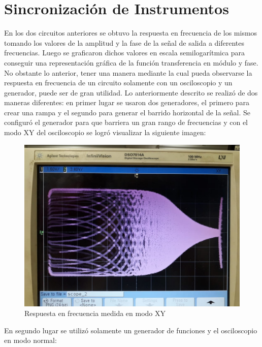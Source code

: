\section{Sincronización de Instrumentos}

En los dos circuitos anteriores se obtuvo la respuesta en frecuencia de los mismos tomando los valores de la amplitud y la fase de la señal de salida a diferentes frecuencias. Luego se graficaron dichos valores en escala semilogarítmica para conseguir una representación gráfica de la función transferencia en módulo y fase. No obstante lo anterior, tener una manera mediante la cual pueda observarse la respuesta en frecuencia de un circuito solamente con un osciloscopio y un generador, puede ser de gran utilidad. Lo anteriormente descrito se realizó de dos maneras diferentes: en primer lugar se usaron dos generadores, el primero para crear una rampa y el segundo para generar el barrido horizontal de la señal. Se configuró el generador para que barriera un gran rango de frecuencias y con el modo XY del osciloscopio se logró visualizar la siguiente imagen: 

\begin{figure}[H]
	\begin{center}
		\includegraphics[scale=0.3]{../Mediciones/Fotos/bodeXY.jpg}
	\end{center}
	\caption{Respuesta en frecuencia medida en modo XY}
	\label{fig:bodeXY}
\end{figure}

En segundo lugar se utilizó solamente un generador de funciones y el osciloscopio en modo normal:


